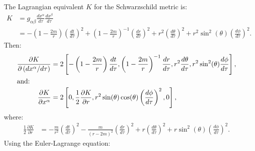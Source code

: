 \documentclass[a4paper]{article}
\begin{document}

\section{}
\subsection{}
The Lagrangian equivalent $K$ for the Schwarzschild metric is:
\begin{align*}
	K &= g_{\alpha \beta} \frac{dx^\alpha}{d\tau} \frac{dx^\beta}{d\tau}\\
	&=	-\left( 1- \frac{2m}{r}\right) \left( \frac{dt}{d\tau} \right)^2 + \left( 1- \frac{2m}{r}\right)^{-1} \left( \frac{dr}{d\tau} \right)^2    + r^2 \left( \frac{d\theta}{d\tau} \right)^2  + r^2 \sin^2(\theta) \left( \frac{d\phi}{d\tau} \right)^2  . 
\end{align*}
Then:
\begin{align*}
\frac{\partial K}{\partial \left(dx^\alpha / d\tau \right)} &= 2\left[-\left( 1- \frac{2m}{r}\right) \frac{dt}{d\tau} , \left( 1- \frac{2m}{r}\right)^{-1} \frac{dr}{d\tau} , r^2 \frac{d\theta}{d\tau} , r^2 \sin^2(\theta) \frac{d\phi}{d\tau} \right], \\
\intertext{and:}
\frac{\partial K}{\partial x^\alpha} &= 2\left[0, \frac{1}{2}\frac{\partial K}{\partial r}, r^2 \sin(\theta)\cos(\theta) \left( \frac{d\phi}{d\tau} \right)^2, 0 \right],
\end{align*}
where:
\begin{align*}
	\frac{1}{2}\frac{\partial K}{\partial r} &= -\frac{m}{r^2} \left(\frac{dt}{d\tau} \right)^2 - \frac{m}{(r-2m)^2}  \left(\frac{dr}{d\tau} \right)^2 + r  \left(\frac{d\theta}{d\tau} \right)^2  + r\sin^2(\theta)  \left(\frac{d\phi}{d\tau} \right)^2.
\end{align*}
Using the Euler-Lagrange equation:
\end{document}
